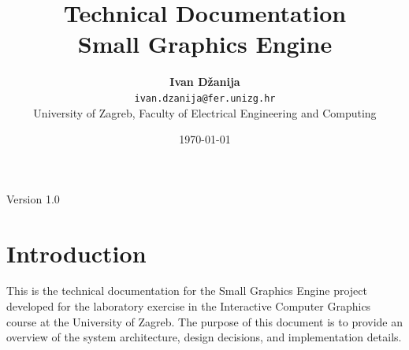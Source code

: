 \documentclass[11pt,a4paper]{article}
\title{
    \vspace{2cm}
    \Huge\bfseries Technical Documentation \\
    \large\color{gray}Small Graphics Engine
}
\author{
    \textbf{Ivan Džanija} \\
    \texttt{ivan.dzanija@fer.unizg.hr} \\
    University of Zagreb, Faculty of Electrical Engineering and Computing
}
\date{\today} %
\begin{document}
\begin{titlepage}
    \clearpage\thispagestyle{empty}
    \maketitle
    \vfill
    \begin{center}
        \small Version 1.0
    \end{center}
\end{titlepage}

\newpage
\tableofcontents
\newpage

\section{Introduction}
This is the technical documentation for the Small Graphics Engine
project developed for the laboratory exercise in the
Interactive Computer Graphics course at the University of Zagreb.
The purpose of this document is to provide
an overview of the system architecture, design decisions,
and implementation details.
\end{document}
